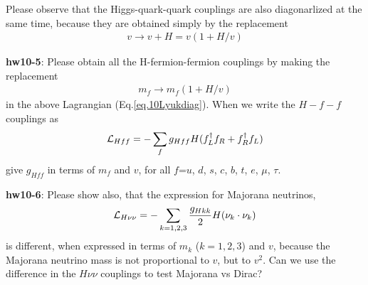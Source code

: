 \documentclass[12pt]{article}
\begin{document}
  Please observe that the Higgs-quark-quark couplings are also
  diagonarlized at the same time, because they are obtained
  simply by the replacement
\begin{eqnarray}
  v \to v + H = v(1+H/v)
\end{eqnarray}

{\bf hw10-5}: Please obtain all the H-fermion-fermion couplings by making the replacement
\begin{eqnarray}
  m_f \to m_f (1+H/v)
\end{eqnarray}
   in the above Lagrangian (Eq.\ref{eq.10Lyukdiag}). When we write the $H-f-f$ couplings as
\begin{eqnarray}
  {\cal L}_{Hff} = - \sum_f g_{Hff} H (f_L^\dagger f_R + f_R^\dagger f_L)
\end{eqnarray}
  give $g_{Hff}$ in terms of $m_f$ and $v$, for all $f$={$u$, $d$, $s$, $c$, $b$, $t$, $e$, $\mu$, $\tau$}.

{\bf hw10-6}: Please show also, that the expression for Majorana neutrinos,
\begin{eqnarray}
  {\cal L}_{H\nu\nu} = - \sum_{k=1,2,3} \frac{g_{Hkk}}{2} H (\nu_k \cdot \nu_k)
\end{eqnarray}
  is different, when expressed in terms of $m_k$ ($k=1,2,3$) and $v$, because
  the Majorana neutrino mass is not proportional to $v$, but to $v^2$.  Can
  we use the difference in the $H\nu\nu$ couplings to test Majorana vs Dirac?
\end{document}
